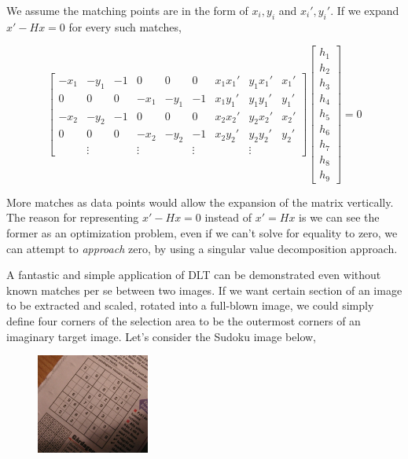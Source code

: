 \documentclass{article}
\begin{document}
We assume the matching points are in the form of $x_i,y_i$ and $x_i',y_i'$.
If we expand $x' - Hx = 0$ for every such matches, 

$$ 
\left[\begin{array}{rrrrrrrrr}
-x_1 & -y_1 & -1 & 0 & 0 & 0 & x_1x_1' & y_1x_1' & x_1' \\
0 & 0 & 0 & -x_1 & -y_1 & -1 & x_1y_1' & y_1y_1' & y_1' \\
-x_2 & -y_2 & -1 & 0 & 0 & 0 & x_2x_2' & y_2x_2' & x_2' \\
0 & 0 & 0 & -x_2 & -y_2 & -1 & x_2y_2' & y_2y_2' & y_2' \\
 &  \vdots &  &  \vdots &  & \vdots &  &  \vdots & 
\end{array}\right]
\left[\begin{array}{r}
h_1 \\ h_2 \\ h_3 \\ h_4 \\ h_5 \\ h_6 \\ h_7 \\ h_8 \\ h_9 
\end{array}\right] = 0
$$

More matches as data points would allow the expansion of the matrix vertically.
The reason for representing $x' - Hx = 0$ instead of $x'=Hx$ is we can see the
former as an optimization problem, even if we can't solve for equality to zero,
we can attempt to {\em approach} zero, by using a singular value decomposition
approach.

A fantastic and simple application of DLT can be demonstrated even without known
matches per se between two images. If we want certain section of an image to be
extracted and scaled, rotated into a full-blown image, we could simply define
four corners of the selection area to be the outermost corners of an imaginary
target image. Let's consider the Sudoku image below,

\begin{figure}[h]
  \centering
  \includegraphics[width=10em]{sudoku81.jpg}
\end{figure}
\end{document}
